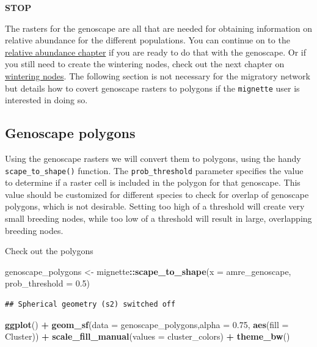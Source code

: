 \documentclass[
]{book}
\newenvironment{Shaded}{\begin{snugshade}}{\end{snugshade}}
\newcommand{\AttributeTok}[1]{\textcolor[rgb]{0.13,0.29,0.53}{#1}}
\newcommand{\FloatTok}[1]{\textcolor[rgb]{0.00,0.00,0.81}{#1}}
\newcommand{\FunctionTok}[1]{\textcolor[rgb]{0.13,0.29,0.53}{\textbf{#1}}}
\newcommand{\NormalTok}[1]{#1}
\newcommand{\OtherTok}[1]{\textcolor[rgb]{0.56,0.35,0.01}{#1}}
\newcommand{\SpecialCharTok}[1]{\textcolor[rgb]{0.81,0.36,0.00}{\textbf{#1}}}
\begin{document}
\textbf{STOP}

The rasters for the genoscape are all that are needed for obtaining information on relative abundance for the different populations. You can continue on to the \protect\hyperlink{abundance}{relative abundance chapter} if you are ready to do that with the genoscape. Or if you still need to create the wintering nodes, check out the next chapter on \protect\hyperlink{wintering}{wintering nodes}. The following section is not necessary for the migratory network but details how to covert genoscape rasters to polygons if the \texttt{mignette} user is interested in doing so.

\hypertarget{genoscape-polygons}{%
\subsection{Genoscape polygons}\label{genoscape-polygons}}

Using the genoscape rasters we will convert them to polygons, using the handy \texttt{scape\_to\_shape()} function. The \texttt{prob\_threshold} parameter specifies the value to determine if a raster cell is included in the polygon for that genoscape. This value should be customized for different species to check for overlap of genoscape polygons, which is not desirable. Setting too high of a threshold will create very small breeding nodes, while too low of a threshold will result in large, overlapping breeding nodes.

Check out the polygons

\begin{Shaded}
\begin{Highlighting}[]
\NormalTok{genoscape\_polygons }\OtherTok{\textless{}{-}}\NormalTok{ mignette}\SpecialCharTok{::}\FunctionTok{scape\_to\_shape}\NormalTok{(}\AttributeTok{x =}\NormalTok{ amre\_genoscape, }
                                               \AttributeTok{prob\_threshold =} \FloatTok{0.5}\NormalTok{)}
\end{Highlighting}
\end{Shaded}

\begin{verbatim}
## Spherical geometry (s2) switched off
\end{verbatim}

\begin{Shaded}
\begin{Highlighting}[]
\FunctionTok{ggplot}\NormalTok{() }\SpecialCharTok{+}
  \FunctionTok{geom\_sf}\NormalTok{(}\AttributeTok{data =}\NormalTok{ genoscape\_polygons,}\AttributeTok{alpha =} \FloatTok{0.75}\NormalTok{, }\FunctionTok{aes}\NormalTok{(}\AttributeTok{fill =}\NormalTok{ Cluster)) }\SpecialCharTok{+}
  \FunctionTok{scale\_fill\_manual}\NormalTok{(}\AttributeTok{values =}\NormalTok{ cluster\_colors) }\SpecialCharTok{+}
  \FunctionTok{theme\_bw}\NormalTok{()}
\end{Highlighting}
\end{Shaded}
\end{document}
